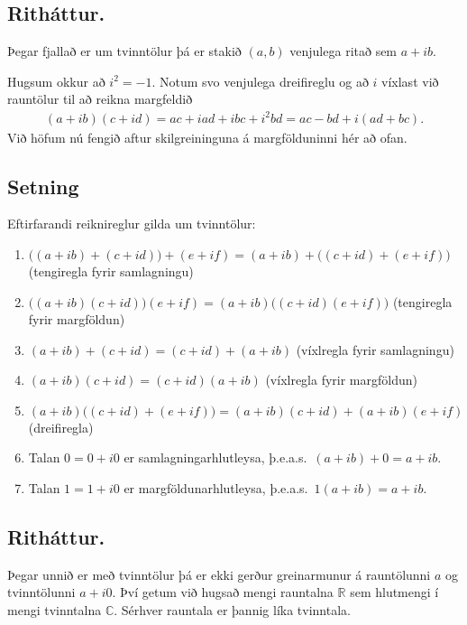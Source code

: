 \documentclass[a4paper,10pt,icelandic]{sphinxmanual}
\begin{document}
\subsection{Ritháttur.}
\label{\detokenize{Kafli01:rithattur}}
Þegar fjallað er um tvinntölur þá er stakið \((a,b)\)
venjulega ritað sem \(a+ib\).

Hugsum okkur að \(i^2=-1\). Notum svo venjulega dreifireglu og að
\(i\) víxlast við rauntölur til að reikna margfeldið
\begin{equation*}
\begin{split}(a+ib)(c+id)=ac+iad+ibc+i^2bd=ac-bd+i(ad+bc).\end{split}
\end{equation*}
Við höfum nú fengið aftur skilgreininguna á margfölduninni hér að ofan.


\subsection{Setning}
\label{\detokenize{Kafli01:setning}}
Eftirfarandi reiknireglur gilda um tvinntölur:
\begin{enumerate}
%
\item {} 
\(\big((a+ib)+(c+id)\big)+(e+if)=(a+ib)+\big((c+id)+(e+if)\big)\) (tengiregla fyrir samlagningu)

\item {} 
\(\big((a+ib)(c+id)\big)(e+if)=(a+ib)\big((c+id)(e+if)\big)\) (tengiregla fyrir margföldun)

\item {} 
\((a+ib)+(c+id)=(c+id)+(a+ib)\) (víxlregla fyrir samlagningu)

\item {} 
\((a+ib)(c+id)=(c+id)(a+ib)\) (víxlregla fyrir margföldun)

\item {} 
\((a+ib)\big((c+id)+(e+if)\big)=(a+ib)(c+id)+(a+ib)(e+if)\) (dreifiregla)

\item {} 
Talan \(0=0+i0\) er samlagningarhlutleysa, þ.e.a.s. \((a+ib)+0=a+ib\).

\item {} 
Talan \(1=1+i0\) er margföldunarhlutleysa, þ.e.a.s. \(1(a+ib)=a+ib\).

\end{enumerate}


\subsection{Ritháttur.}
\label{\detokenize{Kafli01:id1}}
Þegar unnið er með tvinntölur þá er ekki gerður
greinarmunur á rauntölunni \(a\) og tvinntölunni \(a+i0.\) Því
getum við hugsað mengi rauntalna \(\mathbb{R}\) sem hlutmengi í mengi
tvinntalna \({\mathbb{C}}\). Sérhver rauntala er þannig líka tvinntala.
\end{document}
